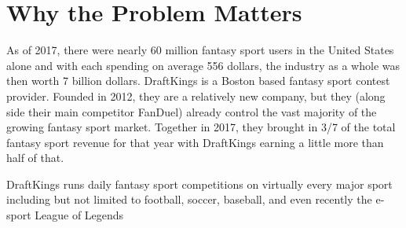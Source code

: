 \section{Why the Problem Matters}

As of 2017, there were nearly 60 million fantasy sport users in the United States alone and with each spending on average 556 dollars, the industry as a whole was then worth 7 billion dollars. DraftKings is a Boston based fantasy sport contest provider. Founded in 2012, they are a relatively new company, but they (along side their main competitor FanDuel) already control the vast majority of the growing fantasy sport market. Together in 2017, they brought in 3/7 of the total fantasy sport revenue for that year with DraftKings earning a little more than half of that.

DraftKings runs daily fantasy sport competitions on virtually every major sport including but not limited to football, soccer, baseball, and even recently the e-sport League of Legends
